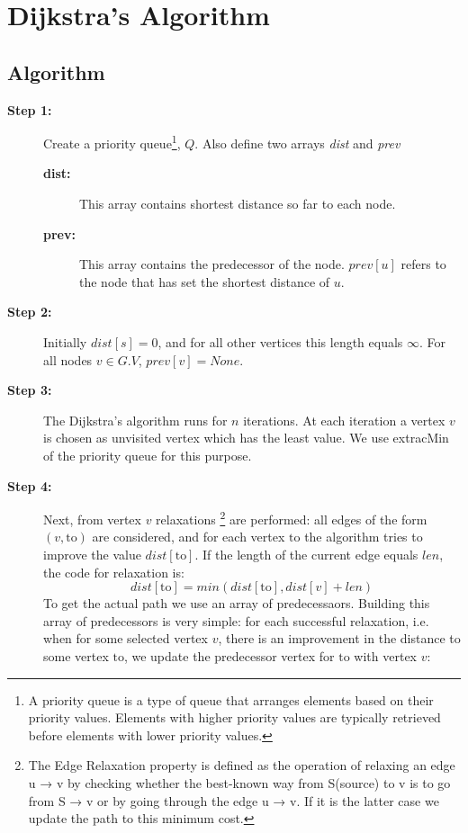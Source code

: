 \documentclass[12pt, a4paper]{article}
\begin{document}
    \section{Dijkstra's Algorithm}
    \subsection{Algorithm}
    \begin{description}
        \item[\textbf{Step 1: }] Create a priority queue\footnote{A priority queue is a type of queue that arranges elements based on their priority values. Elements with higher priority values are typically retrieved before elements with lower priority values.}, $Q$. Also define two arrays \textit{dist} and \textit{prev}
        \begin{description}
            \item[\textbf{dist: }] This array contains shortest distance so far to each node.
            \item[\textbf{prev: }] This array contains the predecessor of the node. $prev[u]$ refers to the node that has set the shortest distance of $u$.
        \end{description}
        \item[\textbf{Step 2: }]  Initially $dist[s] = 0$, and for all other vertices this length equals $\infty$. For all nodes $v \in G.V$, $prev[v] = None$.
        \item[\textbf{Step 3: }] The Dijkstra's algorithm runs for $n$ iterations. At each iteration a vertex $v$ is chosen as unvisited vertex which has the least value. We use extracMin of the priority queue for this purpose.
        \item[\textbf{Step 4: }] Next, from vertex $v$ relaxations \footnote{The Edge Relaxation property is defined as the operation of relaxing an edge u → v by checking whether the best-known way from S(source) to v is to go from S → v or by going through the edge u → v. If it is the latter case we update the path to this minimum cost.} are performed: all edges of the form $(v,\text{to})$ are considered, and for each vertex $\text{to}$ the algorithm tries to improve the value $dist[\text{to}]$. If the length of the current edge equals $len$, the code for relaxation is:
        $$dist[\text{to}] = min(dist[\text{to}], dist[v]+len)$$
        To get the actual path we use an array of predecessaors. Building this array of predecessors is very simple: for each successful relaxation, i.e. when for some selected vertex $v$, there is an improvement in the distance to some vertex $\text{to}$, we update the predecessor vertex for $\text{to}$ with vertex $v$:

\end{description}
\end{document}

